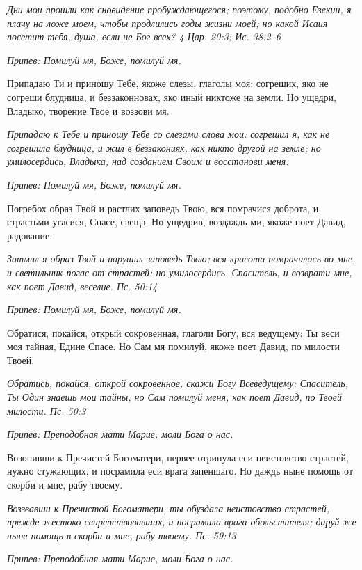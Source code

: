\itshape Дни мои прошли как сновидение пробуждающегося; поэтому, подобно Езекии, я плачу на ложе моем, чтобы продлились годы жизни моей; но какой Исаия посетит тебя, душа, если не Бог всех? 4 Цар. 20:3; Ис. 38:2–6\normalfont{}


\itshape Припев:\normalfont{} Помилуй мя, Боже, помилуй мя.


Припадаю Ти и приношу Тебе, якоже слезы, глаголы моя: согреших, яко не согреши блудница, и беззаконновах, яко иный никтоже на земли. Но ущедри, Владыко, творение Твое и воззови мя.


\itshape Припадаю к Тебе и приношу Тебе со слезами слова мои: согрешил я, как не согрешила блудница, и жил в беззакониях, как никто другой на земле; но умилосердись, Владыка, над созданием Своим и восстанови меня.\normalfont{}


\itshape Припев:\normalfont{} Помилуй мя, Боже, помилуй мя.


Погребох образ Твой и растлих заповедь Твою, вся помрачися доброта, и страстьми угасися, Спасе, свеща. Но ущедрив, воздаждь ми, якоже поет Давид, радование.


\itshape Затмил я образ Твой и нарушил заповедь Твою; вся красота помрачилась во мне, и светильник погас от страстей; но умилосердись, Спаситель, и возврати мне, как поет Давид, веселие. Пс. 50:14\normalfont{}


\itshape Припев:\normalfont{} Помилуй мя, Боже, помилуй мя.


Обратися, покайся, открый сокровенная, глаголи Богу, вся ведущему: Ты веси моя тайная, Едине Спасе. Но Сам мя помилуй, якоже поет Давид, по милости Твоей.


\itshape Обратись, покайся, открой сокровенное, скажи Богу Всеведущему: Спаситель, Ты Один знаешь мои тайны, но Сам помилуй меня, как поет Давид, по Твоей милости. Пс. 50:3\normalfont{}


\itshape Припев:\normalfont{} Преподобная мати Марие, моли Бога о нас.


Возопивши к Пречистей Богоматери, первее отринула еси неистовство страстей, нужно стужающих, и посрамила еси врага запеншаго. Но даждь ныне помощь от скорби и мне, рабу твоему.


\itshape Воззвавши к Пречистой Богоматери, ты обуздала неистовство страстей, прежде жестоко свирепствовавших, и посрамила врага-обольстителя; даруй же ныне помощь в скорби и мне, рабу твоему. Пс. 59:13\normalfont{}


\itshape Припев:\normalfont{} Преподобная мати Марие, моли Бога о нас.


